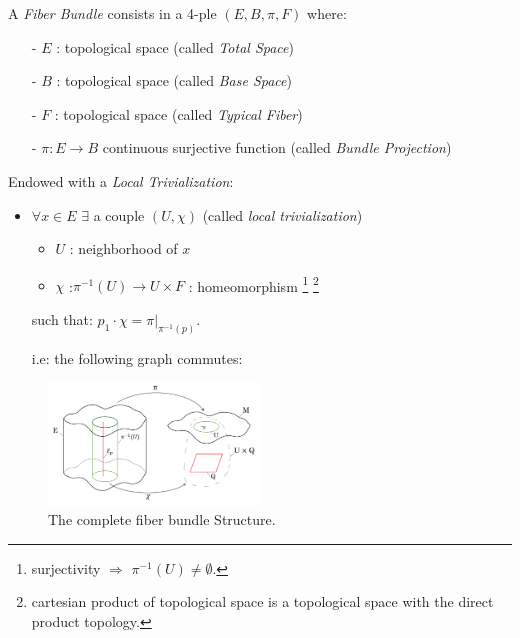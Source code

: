 \documentclass[a4paper,12pt]{scrartcl}    %
\begin{document}
\begin{definition}
A \emph{Fiber Bundle} consists in a 4-ple $(E,B,\pi,F)$ where:
\begin{itemize}
\item[-] $E$ : topological space (called \emph{Total Space})
\item[-] $B$ : topological space (called \emph{Base Space})
\item[-] $F$ : topological space (called \emph{Typical Fiber})
\item[-] $\pi : E \rightarrow B $ continuous surjective function (called \emph{Bundle Projection})
\end{itemize}
Endowed with a \emph{Local Trivialization}:
\begin{itemize}
\item $\forall x \in E$ $\exists$ a couple $(U, \chi)$ (called \emph{local trivialization})
\begin{itemize}
\item $U$ : neighborhood of $x$
\item $\chi$ :$\pi^{-1}(U) \rightarrow U \times F$ : homeomorphism
 \footnote{surjectivity $\Rightarrow$ $\pi^{-1}(U) \neq \emptyset$.} 
 \footnote{cartesian product of topological space is a topological space with the direct product topology.}
\end{itemize}
such that: $p_1 \cdot \chi = \pi \vert_{\pi^{-1}(p)}$.

i.e: the following graph commutes:


\end{itemize}
\end{definition}

\begin{figure}[h!]
  \caption{The complete fiber bundle Structure.}
  	\includegraphics[width=0.5\textwidth]{Pictures/FiberBundle}
  \centering
\end{figure}
\end{document}
